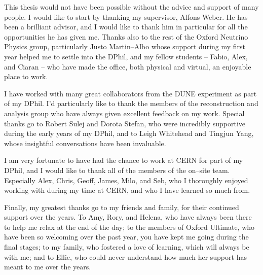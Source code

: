 This thesis would not have been possible without the advice and support of many
people. I would like to start by thanking my supervisor, Alfons Weber. He has
been a brilliant advisor, and I would like to thank him in particular for all
the opportunities he has given me. Thanks also to the rest of the Oxford
Neutrino Physics group, particularly Justo Martin--Albo whose support during 
my first year helped me to settle into the DPhil, and my fellow students -- 
Fabio, Alex, and Ciaran -- who have made the office, both physical and 
virtual, an enjoyable place to work.

\bigskip\noindent
I have worked with many great collaborators from the DUNE experiment
as part of my DPhil. I'd particularly like to thank the members of the 
\protodune{} reconstruction and analysis group who have always given 
excellent feedback on my work. Special thanks go to Robert Sulej and Dorota 
Stefan, who were incredibly supportive during the early years of my DPhil, and 
to Leigh Whitehead and Tingjun Yang, whose insightful conversations have been
invaluable. 

\bigskip\noindent
I am very fortunate to have had the chance to work at CERN for part of my DPhil,
and I would like to thank all of the members of the on--site \protodune{} 
team. Especially Alex, Chris, Geoff, James, Milo, and Seb, who I thoroughly 
enjoyed working with during my time at CERN, and who I have learned so much 
from. 

\bigskip\noindent
Finally, my greatest thanks go to my friends and family, for their continued
support over the years. To Amy, Rory, and Helena, who have always been there to
help me relax at the end of the day; to the members of Oxford Ultimate, who have
been so welcoming over the past year, you have kept me going during the final 
stages; to my family, who fostered a love of learning, which will always be 
with me; and to Ellie, who could never understand how much her support has 
meant to me over the years.
